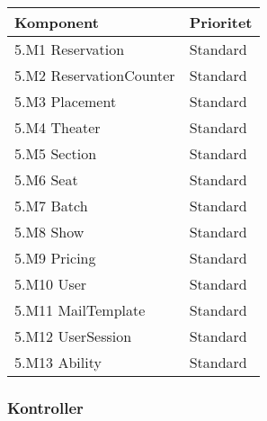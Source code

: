 \documentclass[a4paper, twoside, 11pt, titlepage]{article}
\begin{document}
		\begin {table} [ht] \begin{tabular} {  p{4cm} p{2cm} }
			\hline
			{ Komponent } & { Prioritet } \\
			\hline
			{ 5.M1 Reservation } & { Standard } \\
			\hline
			{ 5.M2 ReservationCounter} & { Standard } \\
			\hline
			{ 5.M3 Placement} & { Standard } \\
			\hline
			{ 5.M4 Theater } & { Standard } \\
			\hline
			{ 5.M5 Section } & { Standard } \\
			\hline
			{ 5.M6 Seat} & { Standard } \\
			\hline
			{ 5.M7 Batch } & { Standard } \\
			\hline
			{ 5.M8 Show} & { Standard } \\
			\hline
			{ 5.M9 Pricing } & { Standard } \\
			\hline
			{ 5.M10 User } & { Standard } \\
			\hline
			{ 5.M11 MailTemplate} & { Standard } \\
			\hline
			{ 5.M12 UserSession } & { Standard } \\
			\hline
			{ 5.M13 Ability } & { Standard } \\
			\hline
		\end{tabular} \end{table} \FloatBarrier


		\subsubsection{Kontroller}
\end{document}
